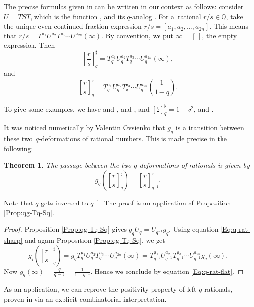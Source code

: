 \documentclass[pdftex]{sigma}
\numberwithin{equation}{section}
\newtheorem{Theorem}{Theorem}[section]
\newcommand*{\Q}{\mathbb{Q}}
\begin{document}
The precise formulas given in \cite[Definition~2.6]{bapat2023q} can be written in our context as follows: consider $U=TST$, which is the function , and its $q$-analog . For a~rational $r/s\in \Q$, take the unique even continued fraction expression $r/s=[a_1,a_2,\dots,a_{2n}]$. This means that $r/s=T^{a_1}U^{a_2}T^{a_3}\cdots U^{a_{2n}}(\infty)$. By convention, we put $\infty=[\,]$, the empty expression. Then
\begin{equation}\label{Eq:q-rat-sharp}
\left[\frac{r}{s}\right]_q^\sharp = T_q^{a_1}U_q^{a_2}T_q^{a_3}\cdots U_q^{a_{2n}}(\infty),
\end{equation}
and
\begin{equation}\label{Eq:q-rat-flat}
\left[\frac{r}{s}\right]_q^\flat = T_q^{a_1}U_q^{a_2}T_q^{a_3}\cdots U_q^{a_{2n}}\left(\frac{1}{1-q}\right).
\end{equation}

To give some examples, we have  and ,  and ,  and $[2]_q^\flat=1+q^2$,  and .


It was noticed numerically by Valentin Ovsienko that $g_q$ is a transition between these two~$q$-deformations of rational numbers. This is made precise in the following:
\begin{Theorem}\label{Thm:passage}
The passage between the two $q$-deformations of rationals is given by
\[
g_q\left(\left[\frac{r}{s}\right]_q^\sharp\right)=\left[\frac{r}{s}\right]_{q^{-1}}^\flat.
\]
\end{Theorem}
Note that $q$ gets inversed to $q^{-1}$. The proof is an application of Proposition \ref{Prop:qg-Tq-Sq}.
\begin{proof}
Proposition \ref{Prop:qg-Tq-Sq} gives $g_qU_q=U_{q^{-1}}g_q$. Using equation \eqref{Eq:q-rat-sharp} and again Proposition \ref{Prop:qg-Tq-Sq}, we get
\[
g_q\left(\left[\frac{r}{s}\right]_q^\sharp\right)=g_qT_q^{a_1}U_q^{a_2}T_q^{a_3}\cdots U_q^{a_{2n}}(\infty)=T_{q^{-1}}^{a_1}U_{q^{-1}}^{a_2}T_{q^{-1}}^{a_3}\cdots U_{q^{-1}}^{a_{2n}}g_q(\infty).
\]
Now $g_q(\infty)=\tfrac{q}{q-1}=\tfrac{1}{1-q^{-1}}$. Hence we conclude by equation \eqref{Eq:q-rat-flat}.
\end{proof}

As an application, we can reprove the positivity property of left $q$-rationals, proven in \cite[Appendix A.1]{bapat2023q} via an explicit combinatorial interpretation.
\end{document}
